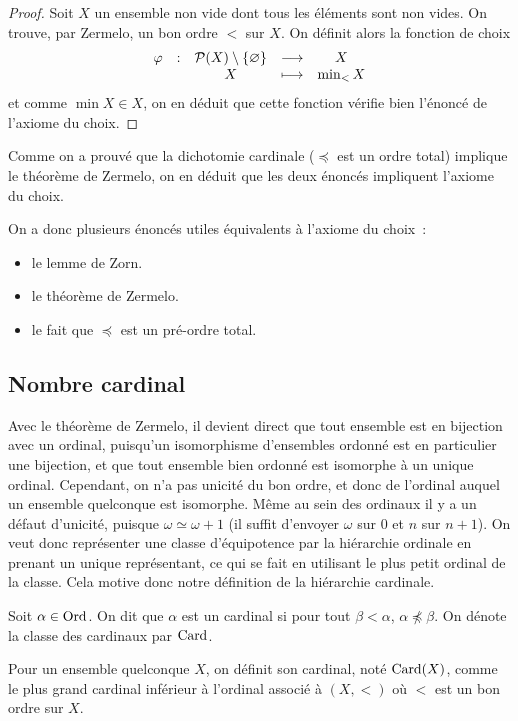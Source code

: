 \begin{proof}
  Soit $X$ un ensemble non vide dont tous les éléments sont non vides.
  On trouve, par Zermelo, un bon ordre $<$ sur $X$. On définit alors la
  fonction de choix
  \[\begin{array}{ccccc}
  \varphi & : & \mathcal{P}(X)\setminus\{\varnothing\} & \longrightarrow
  & X\\
  & & X &\longmapsto & \min_{<} X
  \end{array}\]
  et comme $\min X\in X$, on en déduit que cette fonction vérifie bien l'énoncé
  de l'axiome du choix.
\end{proof}

Comme on a prouvé que la dichotomie cardinale ($\preceq$ est un ordre total)
implique le théorème de Zermelo, on en déduit que les deux énoncés impliquent
l'axiome du choix.

On a donc plusieurs énoncés utiles équivalents à l'axiome du choix~:
\begin{itemize}
\item le lemme de Zorn.
\item le théorème de Zermelo.
\item le fait que $\preceq$ est un pré-ordre total.
\end{itemize}

\subsection{Nombre cardinal}

Avec le théorème de Zermelo, il devient direct que tout ensemble est en
bijection avec un ordinal, puisqu'un isomorphisme d'ensembles ordonné est en
particulier une bijection, et que tout ensemble bien ordonné est isomorphe à
un unique ordinal. Cependant, on n'a pas unicité du bon ordre, et donc de
l'ordinal auquel un ensemble quelconque est isomorphe. Même au sein des ordinaux
il y a un défaut d'unicité, puisque $\omega \simeq \omega + 1$ (il suffit
d'envoyer $\omega$ sur $0$ et $n$ sur $n + 1$). On veut donc représenter une
classe d'équipotence par la hiérarchie ordinale en prenant un unique
représentant, ce qui se fait en utilisant le plus petit ordinal de la classe.
Cela motive donc notre définition de la hiérarchie cardinale.

\begin{definition}[Cardinal]
  Soit $\alpha \in \operatorname{Ord}$. On dit que $\alpha$ est un cardinal si pour tout
  $\beta < \alpha$, $\alpha\not\preceq \beta$. On dénote la classe des cardinaux
  par $\operatorname{Card}$.

  Pour un ensemble quelconque $X$, on définit son cardinal, noté $\operatorname{Card}(X)$,
  comme le plus grand cardinal inférieur à l'ordinal associé à $(X,<)$ où $<$
  est un bon ordre sur $X$.
\end{definition}

